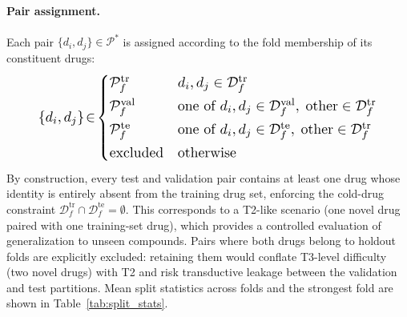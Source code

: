 \documentclass[11pt,a4paper,twocolumn]{article}
\begin{document}
\paragraph{Pair assignment.}
Each pair $\{d_i,d_j\} \in \mathcal{P}^{\ast}$ is assigned according to
the fold membership of its constituent drugs:
\begin{equation}
\resizebox{0.88\columnwidth}{!}{$\displaystyle
  \{d_i,d_j\} \!\in\!
  \begin{cases}
    \mathcal{P}^{\mathrm{tr}}_f
      & d_i, d_j \in \mathcal{D}^{\mathrm{tr}}_f \\[2pt]
    \mathcal{P}^{\mathrm{val}}_f
      & \text{one of } d_i, d_j \in \mathcal{D}^{\mathrm{val}}_f,\;
        \text{other} \in \mathcal{D}^{\mathrm{tr}}_f \\[2pt]
    \mathcal{P}^{\mathrm{te}}_f
      & \text{one of } d_i, d_j \in \mathcal{D}^{\mathrm{te}}_f,\;
        \text{other} \in \mathcal{D}^{\mathrm{tr}}_f \\[2pt]
    \text{excluded}
      & \text{otherwise}
  \end{cases}
$}
\end{equation}
By construction, every test and validation pair contains at least one drug
whose identity is entirely absent from the training drug set, enforcing the
cold-drug constraint
$\mathcal{D}^{\mathrm{tr}}_f \cap \mathcal{D}^{\mathrm{te}}_f = \emptyset$.
This corresponds to a T2-like scenario (one novel drug paired with one
training-set drug), which provides a controlled evaluation of
generalization to unseen compounds.
Pairs where both drugs belong to holdout folds are explicitly excluded:
retaining them would conflate T3-level difficulty (two novel drugs) with
T2 and risk transductive leakage between the validation and test partitions.
Mean split statistics across folds and the strongest fold are shown in
Table~\ref{tab:split_stats}.

\begin{table}[H]
\centering
\caption{Cold-drug split statistics.}
\label{tab:split_stats}
\end{table}
\end{document}
